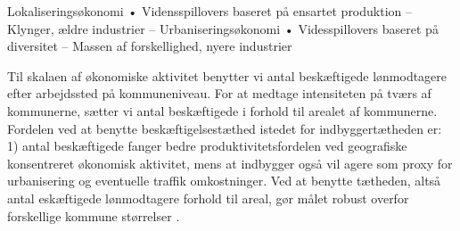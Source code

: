 \documentclass[a4paper, 12pt, titlepage]{article}
\begin{document}
 
 Lokaliseringsøkonomi
• Vidensspillovers baseret på ensartet produktion
– Klynger, ældre industrier – Urbaniseringsøkonomi
• Videsspillovers baseret på diversitet
– Massen af forskellighed, nyere industrier

Til skalaen af økonomiske aktivitet benytter vi antal beskæftigede lønmodtagere efter arbejdssted på kommuneniveau. For at medtage intensiteten på tværs af kommunerne, sætter vi antal beskæftigede i forhold til arealet af kommunerne. Fordelen ved at benytte beskæftigelsestæthed istedet for indbyggertætheden er: 1) antal beskæftigede fanger bedre produktivitetsfordelen ved geografiske konsentreret økonomisk aktivitet, mens at indbygger også vil agere som proxy for urbanisering og eventuelle traffik omkostninger. Ved at benytte tætheden, altså antal eskæftigede lønmodtagere forhold til areal, gør målet robust overfor forskellige kommune størrelser \cite[pp. 335.]{melo2009meta}.
\end{document}
